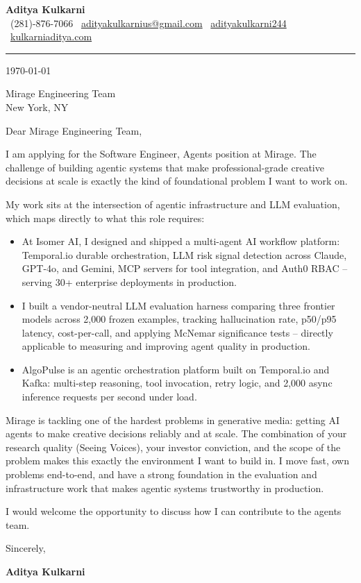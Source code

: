 \documentclass[11pt,a4paper]{article}
\makeatletter
\newcommand{\CLheader}{%
  \begin{center}
    {\Large \textbf{Aditya Kulkarni}}\\[4pt]
    \textcolor{brand}{\faPhone}\ (281)-876-7066 \quad
    \textcolor{brand}{\faEnvelope}\ \href{mailto:adityakulkarnius@gmail.com}{adityakulkarnius@gmail.com} \quad
    \textcolor{brand}{\faLinkedin}\ \href{https://linkedin.com/in/adityakulkarni244}{adityakulkarni244} \quad
    \textcolor{brand}{\faGlobe}\ \href{https://kulkarniaditya.com}{kulkarniaditya.com}
  \end{center}
  \vspace{4pt}
  \textcolor{brand}{\rule{\linewidth}{1.2pt}}
  \vspace{6pt}
}
\makeatother
\begin{document}
\CLheader

\today

\vspace{8pt}

Mirage Engineering Team\\
New York, NY

\vspace{8pt}

Dear Mirage Engineering Team,

\vspace{6pt}

I am applying for the Software Engineer, Agents position at Mirage. The challenge of building agentic systems that make professional-grade creative decisions at scale is exactly the kind of foundational problem I want to work on.

\vspace{6pt}

My work sits at the intersection of agentic infrastructure and LLM evaluation, which maps directly to what this role requires:

\vspace{4pt}
\begin{itemize}
  \item[\textcolor{brand}{\faAngleRight}] At Isomer AI, I designed and shipped a multi-agent AI workflow platform: Temporal.io durable orchestration, LLM risk signal detection across Claude, GPT-4o, and Gemini, MCP servers for tool integration, and Auth0 RBAC -- serving 30+ enterprise deployments in production.
  \item[\textcolor{brand}{\faAngleRight}] I built a vendor-neutral LLM evaluation harness comparing three frontier models across 2,000 frozen examples, tracking hallucination rate, p50/p95 latency, cost-per-call, and applying McNemar significance tests -- directly applicable to measuring and improving agent quality in production.
  \item[\textcolor{brand}{\faAngleRight}] AlgoPulse is an agentic orchestration platform built on Temporal.io and Kafka: multi-step reasoning, tool invocation, retry logic, and 2,000 async inference requests per second under load.
\end{itemize}

\vspace{6pt}

Mirage is tackling one of the hardest problems in generative media: getting AI agents to make creative decisions reliably and at scale. The combination of your research quality (Seeing Voices), your investor conviction, and the scope of the problem makes this exactly the environment I want to build in. I move fast, own problems end-to-end, and have a strong foundation in the evaluation and infrastructure work that makes agentic systems trustworthy in production.

\vspace{6pt}

I would welcome the opportunity to discuss how I can contribute to the agents team.

\vspace{12pt}

Sincerely,

\vspace{6pt}
\textbf{Aditya Kulkarni}
\end{document}
